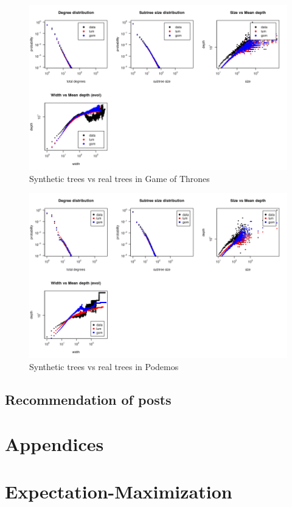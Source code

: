 \documentclass[smallextended]{svjour3}          %
\begin{document}
\begin{figure}
\center
\includegraphics[width=1\textwidth]{benchmark_structures_gof}
\caption{Synthetic trees vs real trees in Game of Thrones}
\end{figure}
\begin{figure}
\center
\includegraphics[width=1\textwidth]{benchmark_structures_podemos}
\caption{Synthetic trees vs real trees in Podemos}
\end{figure}

\subsection{Recommendation of posts}

\newpage
\appendix
\section*{Appendices}
\section{Expectation-Maximization}
\end{document}
